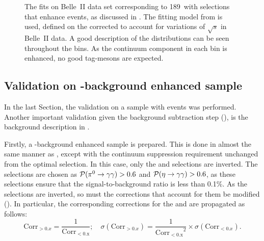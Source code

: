\begin{figure}[htbp!]
{    }
    \caption{\label{fig:mbc_qqbar_ehnhanced_fits}The fits on Belle~II data set corresponding to 189~\invfb with selections that enhance \epem\ra\qqbar events, as discussed in .
    The fitting model from  is used, defined on the corrected \Mbc to account for variations of $\sqrt{s}$ in Belle~II data.
    A good description of the \Mbc distributions can be seen throughout the \EB bins.
    As the continuum component in each \EB bin is enhanced, no good tag-\B mesons are expected.
    }
\end{figure}

\subsection{Validation on \texorpdfstring{\BB}{BB}-background enhanced sample}\label{sec:bb_background_validation}

In the last Section, the validation on a sample with \epem\ra\qqbar events was performed.
Another important validation given the background subtraction step (),
is the \BB background description in \MC.

Firstly, a \BB-background enhanced sample is prepared.
This is done in almost the same manner as , except with the continuum suppression requirement unchanged from the optimal selection.
In this case, only the \piVeto and \etaVeto selections are inverted.
The selections are chosen as ${\mathcal{P}(\pi^0\rightarrow\gamma\gamma)}>0.6$ and ${\mathcal{P}(\eta\rightarrow\gamma\gamma)}>0.6$, as these selections ensure that the signal-to-background ratio is less than 0.1\%.
As the selections are inverted, so must the corrections that account for them be modified ().
In particular, the corresponding corrections for the \piVeto and \etaVeto are propagated as follows:
\begin{equation}\label{eq:correction_transform}
    \mathrm{Corr}_{>0.x} = \frac{1}{\mathrm{Corr_{<0.x}}}; \quad \sigma(\mathrm{Corr}_{>0.x}) =  \frac{1}{\mathrm{Corr_{<0.x}}^2} \times \sigma(\mathrm{Corr}_{<0.x}).
\end{equation}

